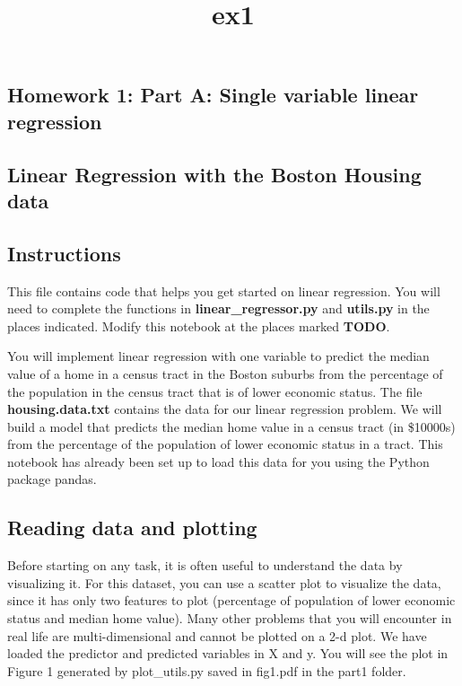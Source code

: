 \documentclass[11pt]{article}
\title{ex1}
\begin{document}
    
    
    \maketitle
    
    

    
    \subsection{Homework 1: Part A: Single variable linear
regression}\label{homework-1-part-a-single-variable-linear-regression}

\subsection{Linear Regression with the Boston Housing
data}\label{linear-regression-with-the-boston-housing-data}

    \subsection{Instructions}\label{instructions}

This file contains code that helps you get started on linear regression.
You will need to complete the functions in \textbf{linear\_regressor.py}
and \textbf{utils.py} in the places indicated. Modify this notebook at
the places marked \textbf{TODO}.

You will implement linear regression with one variable to predict the
median value of a home in a census tract in the Boston suburbs from the
percentage of the population in the census tract that is of lower
economic status. The file \textbf{housing.data.txt} contains the data
for our linear regression problem. We will build a model that predicts
the median home value in a census tract (in \$10000s) from the
percentage of the population of lower economic status in a tract. This
notebook has already been set up to load this data for you using the
Python package pandas.

    \subsection{Reading data and plotting}\label{reading-data-and-plotting}

Before starting on any task, it is often useful to understand the data
by visualizing it. For this dataset, you can use a scatter plot to
visualize the data, since it has only two features to plot (percentage
of population of lower economic status and median home value). Many
other problems that you will encounter in real life are
multi-dimensional and cannot be plotted on a 2-d plot. We have loaded
the predictor and predicted variables in X and y. You will see the plot
in Figure 1 generated by plot\_utils.py saved in fig1.pdf in the part1
folder.
\end{document}
